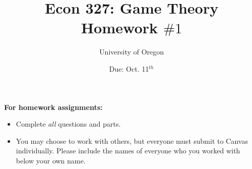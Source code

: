\documentclass[addpoints]{exam}
\title{
    \textbf{Econ 327: Game Theory} \\ 
    Homework $\#1$
    }
\author{University of Oregon}
\date{Due: Oct. 11$^{th}$}
\begin{document}
\maketitle

\begin{center}
  \gradetable[h][questions]
\end{center}

\vspace{0.5in}

\begin{center}
  \textbf{For homework assignments:}
\end{center}

\begin{itemize}


  \item Complete \textit{all} questions and parts.

  \item You may choose to work with others,
  but everyone must submit to Canvas individually.
  Please include the names of everyone who you worked with 
  below your own name.
 
\end{itemize}

\vspace{1.0in}


\vspace{0.5in}


\newpage
\end{document}
